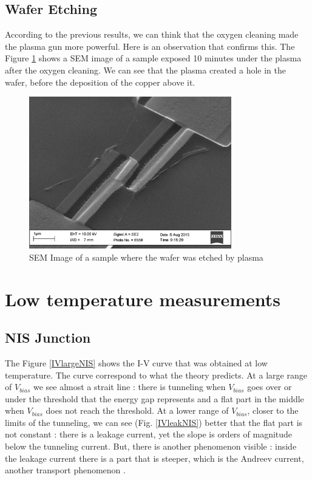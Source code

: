             \subsection{Wafer Etching}
                According to the previous results, we can think that the oxygen cleaning made the plasma gun more powerful. Here is an observation that confirms this. The Figure \ref{WaferEtch} shows a SEM image of a sample exposed 10 minutes under the plasma after the oxygen cleaning. We can see that the plasma created a hole in the wafer, before the deposition of the copper above it.
                
            \begin{figure}
                \centering
                \includegraphics[width=250pt]{tiltSEM.jpg}
                \caption{SEM Image of a sample where the wafer was etched by plasma}
                \label{WaferEtch}
            \end{figure}
                
                \section{Low temperature measurements}
                
                \subsection{NIS Junction}
                
                The Figure \ref{IVlargeNIS} shows the I-V curve that was obtained at low temperature. The curve correspond to what the theory predicts. At a large range of $V_{bias}$ we see almost a strait line : there is tunneling when $V_{bias}$ goes over or under the threshold that the energy gap represents and a flat part in the middle when $V_{bias}$ does not reach the threshold. At a lower range of $V_{bias}$, closer to the limits of the tunneling, we can see (Fig. \ref{IVleakNIS}) better that the flat part is not constant : there is a leakage current, yet the slope is orders of magnitude below the tunneling current. But, there is another phenomenon visible : inside the leakage current there is a part that is steeper, which is the Andreev current, another transport phenomenon \cite{Andreev}.
                
